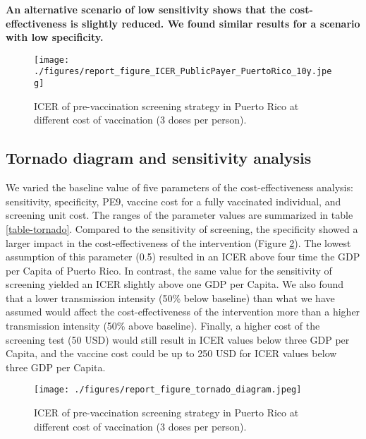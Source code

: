\documentclass[11pt]{article}
\begin{document}
\textbf{An alternative scenario of low sensitivity shows that the cost-effectiveness is slightly reduced. We found similar results for a scenario with low specificity.} 


\begin{figure}[H]
\centering \texttt{[image: ./figures/report\_figure\_ICER\_PublicPayer\_PuertoRico\_10y.jpeg]}
\label{fig-ICER}
\caption{ICER of pre-vaccination screening strategy in Puerto Rico at different cost of vaccination (3 doses per person).} 
\end{figure}

\subsection{Tornado diagram and sensitivity analysis}
\label{sec:org0147e73}
We varied the baseline value of five parameters of the cost-effectiveness analysis: sensitivity, specificity, PE9, vaccine cost for a fully vaccinated individual, and screening unit cost. The ranges of the parameter values are summarized in table \ref{table-tornado}. Compared to the sensitivity of screening, the specificity showed a larger impact in the cost-effectiveness of the intervention (Figure \ref{fig-tornado}). The lowest assumption of this parameter (0.5) resulted in an ICER above four time the GDP per Capita of Puerto Rico. In contrast, the same value for the sensitivity of screening yielded an ICER slightly above one GDP per Capita. We also found that a lower transmission intensity (50\% below baseline) than what we have assumed would affect the cost-effectiveness of the intervention more than a higher transmission intensity (50\% above baseline). Finally, a higher cost of the screening test (50 USD) would still result in ICER values below three GDP per Capita, and the vaccine cost could be up to 250 USD for ICER values below three GDP per Capita. 


\begin{figure}[H]
\centering \texttt{[image: ./figures/report\_figure\_tornado\_diagram.jpeg]}
\label{fig-tornado}
\caption{ICER of pre-vaccination screening strategy in Puerto Rico at different cost of vaccination (3 doses per person).} 
\end{figure}
\end{document}
